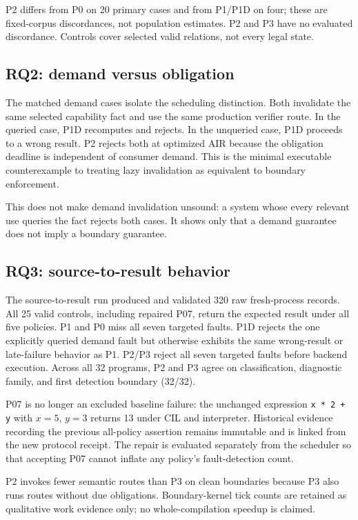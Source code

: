 P2 differs from P0 on 20 primary cases and from P1/P1D on four; these are fixed-corpus discordances, not population estimates. P2 and P3 have no evaluated discordance. Controls cover selected valid relations, not every legal state.

\subsection{RQ2: demand versus obligation}
The matched demand cases isolate the scheduling distinction. Both invalidate the same selected capability fact and use the same production verifier route. In the queried case, P1D recomputes and rejects. In the unqueried case, P1D proceeds to a wrong result. P2 rejects both at optimized AIR because the obligation deadline is independent of consumer demand. This is the minimal executable counterexample to treating lazy invalidation as equivalent to boundary enforcement.

This does not make demand invalidation unsound: a system whose every relevant use queries the fact rejects both cases. It shows only that a demand guarantee does not imply a boundary guarantee.

\subsection{RQ3: source-to-result behavior}
The source-to-result run produced and validated 320 raw fresh-process records. All 25 valid controls, including repaired P07, return the expected result under all five policies. P1 and P0 miss all seven targeted faults. P1D rejects the one explicitly queried demand fault but otherwise exhibits the same wrong-result or late-failure behavior as P1. P2/P3 reject all seven targeted faults before backend execution. Across all 32 programs, P2 and P3 agree on classification, diagnostic family, and first detection boundary (32/32).

P07 is no longer an excluded baseline failure: the unchanged expression \texttt{x * 2 + y} with $x=5$, $y=3$ returns 13 under CIL and interpreter. Historical evidence recording the previous all-policy assertion remains immutable and is linked from the new protocol receipt.  The repair is evaluated separately from the scheduler so that accepting P07 cannot inflate any policy's fault-detection count.

P2 invokes fewer semantic routes than P3 on clean boundaries because P3 also runs routes without due obligations. Boundary-kernel tick counts are retained as qualitative work evidence only; no whole-compilation speedup is claimed.

